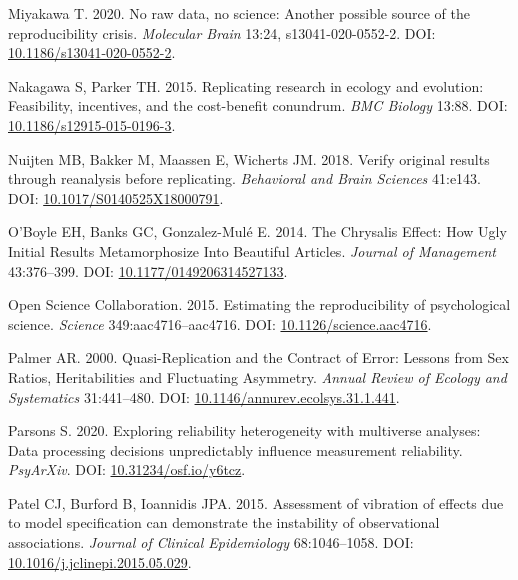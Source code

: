 \documentclass[10pt,a4paper]{article}
\newlength{\cslhangindent}
\newlength{\cslentryspacingunit} %
\newenvironment{CSLReferences}[2] %
 {%
  \setlength{\parindent}{0pt}
  \ifodd #1
  \let\oldpar\par
  \def\par{\hangindent=\cslhangindent\oldpar}
  \fi
  \setlength{\parskip}{#2\cslentryspacingunit}
 }%
 {}
\begin{document}
\begin{CSLReferences}{1}{0}
\leavevmode{}%
Miyakawa T. 2020. No raw data, no science: Another possible source of the reproducibility crisis. \emph{Molecular Brain} 13:24, s13041-020-0552-2. DOI: \href{https://doi.org/10.1186/s13041-020-0552-2}{10.1186/s13041-020-0552-2}.

\leavevmode{}%
Nakagawa S, Parker TH. 2015. Replicating research in ecology and evolution: Feasibility, incentives, and the cost-benefit conundrum. \emph{BMC Biology} 13:88. DOI: \href{https://doi.org/10.1186/s12915-015-0196-3}{10.1186/s12915-015-0196-3}.

\leavevmode{}%
Nuijten MB, Bakker M, Maassen E, Wicherts JM. 2018. Verify original results through reanalysis before replicating. \emph{Behavioral and Brain Sciences} 41:e143. DOI: \href{https://doi.org/10.1017/S0140525X18000791}{10.1017/S0140525X18000791}.

\leavevmode{}%
O'Boyle EH, Banks GC, Gonzalez-Mulé E. 2014. The {Chrysalis} {Effect}: {How} {Ugly} {Initial} {Results} {Metamorphosize} {Into} {Beautiful} {Articles}. \emph{Journal of Management} 43:376--399. DOI: \href{https://doi.org/10.1177/0149206314527133}{10.1177/0149206314527133}.

\leavevmode{}%
Open Science Collaboration. 2015. Estimating the reproducibility of psychological science. \emph{Science} 349:aac4716--aac4716. DOI: \href{https://doi.org/10.1126/science.aac4716}{10.1126/science.aac4716}.

\leavevmode{}%
Palmer AR. 2000. Quasi-{Replication} and the {Contract} of {Error}: {Lessons} from {Sex} {Ratios}, {Heritabilities} and {Fluctuating} {Asymmetry}. \emph{Annual Review of Ecology and Systematics} 31:441--480. DOI: \href{https://doi.org/10.1146/annurev.ecolsys.31.1.441}{10.1146/annurev.ecolsys.31.1.441}.

\leavevmode{}%
Parsons S. 2020. Exploring reliability heterogeneity with multiverse analyses: {Data} processing decisions unpredictably influence measurement reliability. \emph{PsyArXiv}. DOI: \href{https://doi.org/10.31234/osf.io/y6tcz}{10.31234/osf.io/y6tcz}.

\leavevmode{}%
Patel CJ, Burford B, Ioannidis JPA. 2015. Assessment of vibration of effects due to model specification can demonstrate the instability of observational associations. \emph{Journal of Clinical Epidemiology} 68:1046--1058. DOI: \href{https://doi.org/10.1016/j.jclinepi.2015.05.029}{10.1016/j.jclinepi.2015.05.029}.


\end{CSLReferences}
\end{document}
